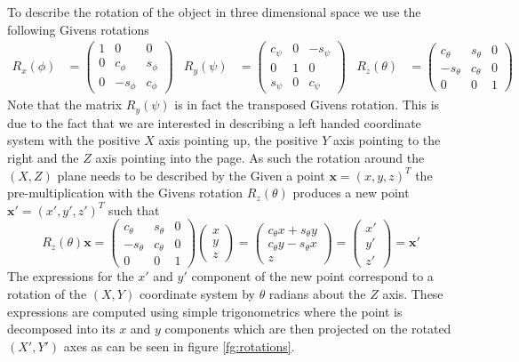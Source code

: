 \documentclass[11pt,a4paper,twoside]{report}
\begin{document}
To describe the rotation of the object in three dimensional space we
use the following Givens rotations
\begin{align}\label{eq:rotations}
R_x(\phi) &= \begin{pmatrix}1&0&0\\0&c_\phi&s_\phi\\0&-s_\phi&c_\phi\end{pmatrix} &  R_y(\psi)
  &= \begin{pmatrix}c_\psi&0&-s_\psi\\0&1&0\\s_\psi&0&c_\psi\end{pmatrix}
 & R_z(\theta) &= \begin{pmatrix}c_\theta&s_\theta&0\\-s_\theta&c_\theta&0\\0&0&1\end{pmatrix}
\end{align}
Note that the matrix $R_y(\psi)$ is in fact the transposed Givens rotation. This
is due to the fact that we are interested in describing a left handed coordinate\footnotemark {} system with the positive $X$ axis pointing up, the positive $Y$
axis pointing to the right and the $Z$ axis pointing into the page. As such the
rotation around the $(X,Z)$ plane needs to be described by the 
Given a point $\mathbf{x} = (x,y,z)^T$ the pre-multiplication with the
Givens rotation $R_z(\theta)$ produces a new point $\mathbf{x'} = (x',y',z')^T$ such that 
\begin{equation}\label{eq:rotated}
R_z(\theta) \mathbf{x} = \begin{pmatrix}c_\theta&s_\theta&0\\-s_\theta&c_\theta&0\\0&0&1\end{pmatrix}\begin{pmatrix}x\\y\\z\end{pmatrix}
    = \begin{pmatrix}c_\theta x + s_\theta y\\c_\theta y - s_\theta
      x\\z\end{pmatrix} = \begin{pmatrix}x'\\y'\\z'\end{pmatrix} = \mathbf{x'}
\end{equation}
The expressions for the $x'$ and $y'$ component of the new point correspond to a
rotation of the $(X,Y)$ coordinate system by $\theta$ radians about the $Z$
axis. These expressions are computed using simple trigonometrics where the point
is decomposed into its $x$ and $y$ components which are then projected on the rotated
$(X',Y')$ axes as can be seen in figure \ref{fg:rotations}. 
\end{document}
